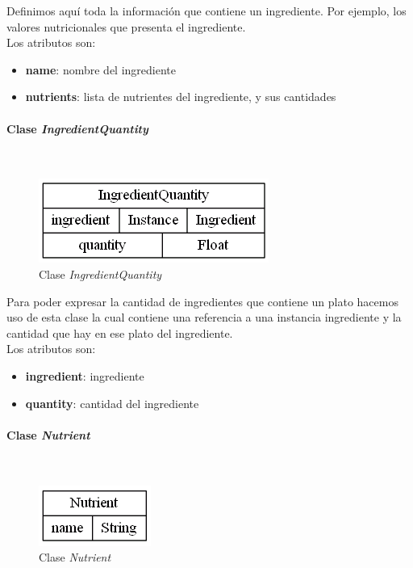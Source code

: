 \documentclass[11]{article}
\begin{document}
Definimos aquí toda la información que contiene un ingrediente. Por ejemplo, los valores nutricionales que presenta el ingrediente.
\\

Los atributos son: 
\begin{itemize}
\item \textbf{name}: nombre del ingrediente
\item \textbf{nutrients}: lista de nutrientes del ingrediente, y sus cantidades
\end{itemize}


\vspace{0.5cm}


\paragraph{Clase \emph{IngredientQuantity}}\mbox{}\\
\begin{figure}[H]
\centering
\includegraphics[scale=0.5]{images/class_IngredientQuantity.png}
\caption{Clase \emph{IngredientQuantity}}
\label{fig_class_IngredientQuantity}
\end{figure}

Para poder expresar la cantidad de ingredientes que contiene un plato hacemos uso de esta clase la cual contiene una referencia a una instancia ingrediente y la cantidad que hay en ese plato del ingrediente.
\\

Los atributos son:
\begin{itemize}
\item \textbf{ingredient}: ingrediente
\item \textbf{quantity}: cantidad del ingrediente
\end{itemize}


\vspace{0.5cm}

\paragraph{Clase \emph{Nutrient}}\mbox{}\\
\begin{figure}[H]
\centering
\includegraphics[scale=0.5]{images/class_Nutrient.png}
\caption{Clase \emph{Nutrient}}
\label{fig_class_Nutrient}
\end{figure}
\end{document}
